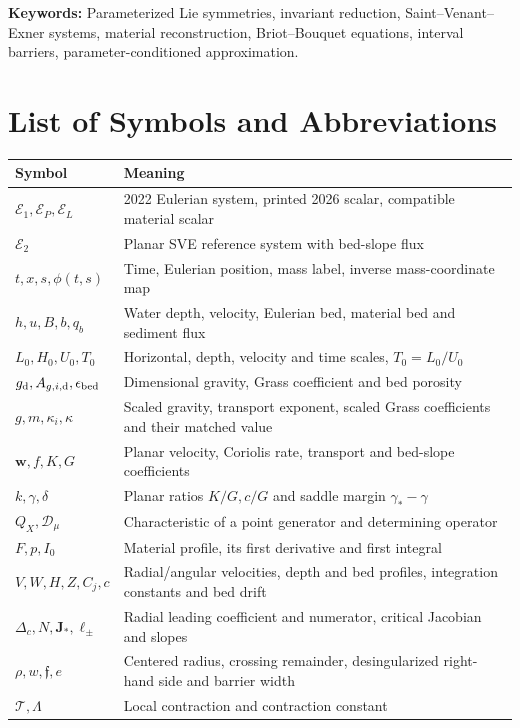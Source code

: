 \documentclass[12pt,a4paper,oneside]{report}
\numberwithin{equation}{chapter}
\theoremstyle{definition}
\theoremstyle{remark}\newtheorem{remark}[theorem]{Remark}
\newif\ifreviewmarks
\DeclareRobustCommand{\review}[1]{{\ifreviewmarks\color{authorblue}\fi #1}}
\renewcommand{\arraystretch}{1.3}
\begin{document}
\bigskip
\noindent\textbf{Keywords:} \review{Parameterized Lie symmetries, invariant reduction, Saint--Venant--Exner systems, material reconstruction, Briot--Bouquet equations, interval barriers, parameter-conditioned approximation.}

\clearpage
\tableofcontents
\clearpage
{}
\listoffigures
\clearpage
{}
\listoftables
\clearpage
\chapter*{List of Symbols and Abbreviations}
{\footnotesize
\renewcommand{\arraystretch}{1.14}
\begin{tabularx}{\linewidth}{@{}p{.32\linewidth}X@{}}
\toprule
Symbol & Meaning\\\midrule
$\mathcal E_1,\mathcal E_P,\mathcal E_L$ & 2022 Eulerian system, printed 2026 scalar, compatible material scalar\\
$\mathcal E_2$ & Planar SVE reference system with bed-slope flux\\
$t,x,s,\phi(t,s)$ & Time, Eulerian position, mass label, inverse mass-coordinate map\\
$h,u,B,b,q_b$ & Water depth, velocity, Eulerian bed, material bed and sediment flux\\
$L_0,H_0,U_0,T_0$ & Horizontal, depth, velocity and time scales, $T_0=L_0/U_0$\\
$g_{\rm d},A_{g,i,\rm d},\epsilon_{\rm bed}$ & Dimensional gravity, Grass coefficient and bed porosity\\
$g,m,\kappa_i,\kappa$ & Scaled gravity, transport exponent, scaled Grass coefficients and their matched value\\
$\mathbf w,f,K,G$ & Planar velocity, Coriolis rate, transport and bed-slope coefficients\\
$k,\gamma,\delta$ & \review{Planar ratios $K/G,c/G$ and saddle margin $\gamma_*-\gamma$}\\
$Q_X,\mathscr D_\mu$ & Characteristic of a point generator and determining operator\\
$F,p,I_0$ & Material profile, its first derivative and first integral\\
$V,W,H,Z,C_j,c$ & Radial/angular velocities, depth and bed profiles, integration constants and bed drift\\
$\Delta_c,N,\mathbf J_*,\ell_\pm$ & Radial leading coefficient and numerator, critical Jacobian and slopes\\
$\rho,w,\mathfrak f,e$ & \review{Centered radius, crossing remainder, desingularized right-hand side and barrier width}\\
$\mathcal T,\Lambda$ & Local contraction and contraction constant\\
\bottomrule
\end{tabularx}}
\clearpage
{}
\end{document}

